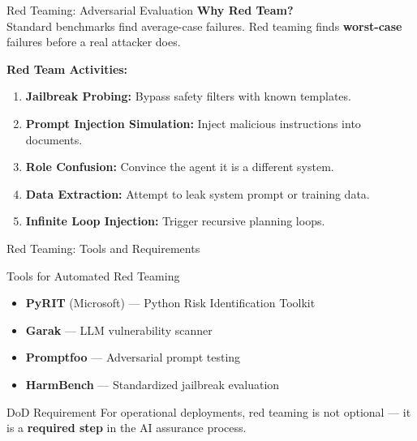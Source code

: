 \documentclass{beamer}       %
\begin{document}
\begin{frame}{Red Teaming: Adversarial Evaluation}
    \small
    \textbf{Why Red Team?} \\
    Standard benchmarks find average-case failures. Red teaming finds \textbf{worst-case} failures before a real attacker does.
    \vspace{0.2cm}

    \textbf{Red Team Activities:}
    \begin{enumerate}
        \item \textbf{Jailbreak Probing:} Bypass safety filters with known templates.
        \item \textbf{Prompt Injection Simulation:} Inject malicious instructions into documents.
        \item \textbf{Role Confusion:} Convince the agent it is a different system.
        \item \textbf{Data Extraction:} Attempt to leak system prompt or training data.
        \item \textbf{Infinite Loop Injection:} Trigger recursive planning loops.
    \end{enumerate}
\end{frame}

\begin{frame}{Red Teaming: Tools and Requirements}
    \begin{block}{Tools for Automated Red Teaming}
        \begin{itemize}
            \item \textbf{PyRIT} (Microsoft) --- Python Risk Identification Toolkit
            \item \textbf{Garak} --- LLM vulnerability scanner
            \item \textbf{Promptfoo} --- Adversarial prompt testing
            \item \textbf{HarmBench} --- Standardized jailbreak evaluation
        \end{itemize}
    \end{block}
    \vfill
    \begin{alertblock}{DoD Requirement}
        For operational deployments, red teaming is not optional --- it is a \textbf{required step} in the AI assurance process.
    \end{alertblock}
\end{frame}
\end{document}
